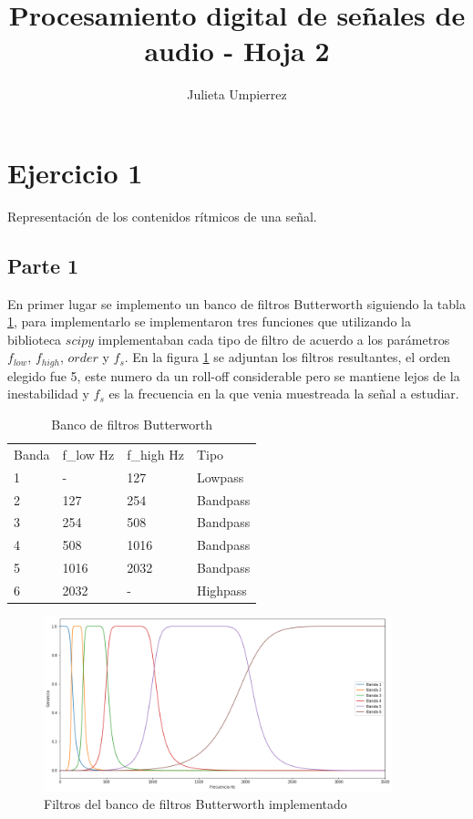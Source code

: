 \documentclass[a4paper]{article}
\title{Procesamiento digital de señales de audio - Hoja 2}
\author{Julieta Umpierrez}
\date{\vspace{-5ex}}
\begin{document}
\maketitle

\section{Ejercicio 1 }
Representación de los contenidos rítmicos de una señal.
\subsection{Parte 1}
En primer lugar se implemento un banco de filtros Butterworth siguiendo la tabla \ref{table:one}, para implementarlo se implementaron tres funciones que utilizando la biblioteca $scipy$ implementaban cada tipo de filtro de acuerdo a los parámetros  $f_{low}$, $f_{high}$, $order$ y $f_s$. En la figura \ref{bancoresu} se adjuntan los filtros resultantes, el orden elegido fue 5, este numero da un roll-off considerable pero se mantiene lejos de la inestabilidad y $f_s$ es la frecuencia en la que venia muestreada la señal a estudiar. 
\begin{table}[h]
\centering
\begin{tabular}{llll}
Banda & f\_low Hz & f\_high Hz & Tipo \\
1 & - & 127 & Lowpass \\
2 & 127 & 254 & Bandpass \\
3 & 254 & 508 & Bandpass \\
4 & 508 & 1016 & Bandpass \\
5 & 1016 & 2032 & Bandpass \\
6 & 2032 & - & Highpass
\end{tabular}

\caption{Banco de filtros Butterworth}
\label{table:one}
\end{table}
\begin{figure}[h]
\centering
\includegraphics[width=0.9\textwidth]{banco.png}
\caption{Filtros del banco de filtros Butterworth implementado}
\label{bancoresu}
\end{figure}
\end{document}
